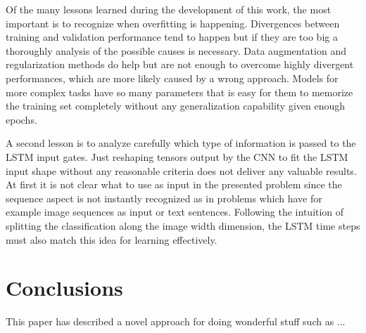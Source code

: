 Of the many lessons learned during the development of this work, the most important is to recognize when overfitting is happening. Divergences between training and validation performance tend to happen but if they are too big a thoroughly analysis of the possible causes is necessary. Data augmentation and regularization methods do help but are not enough to overcome highly divergent performances, which are more likely caused by a wrong approach. Models for more complex tasks have so many parameters that is easy for them to memorize the training set completely without any generalization capability given enough epochs. 

A second lesson is to analyze carefully which type of information is passed to the LSTM input gates. Just reshaping tensors output by the CNN to fit the LSTM input shape without any reasonable criteria does not deliver any valuable results. At first it is not clear what to use as input in the presented problem since the sequence aspect is not instantly recognized as in problems which have for example image sequences as input or text sentences. Following the intuition of splitting the classification along the image width dimension, the LSTM time steps must also match this idea for learning effectively. 

\section{Conclusions}

This paper has described a novel approach for doing wonderful stuff such as ...
